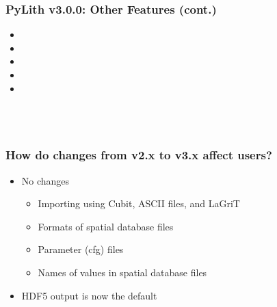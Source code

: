 \documentclass[aspectratio=169]{beamer}
\begin{document}
\begin{frame}
  \frametitle{PyLith v3.0.0: Other Features  (cont.)}
  \summary{}

  \begin{itemize}
  \item {}
  \item {}
  \item {}
  \item {}
  \item {}
 \end{itemize}
  \vfill\hfill%
  \begin{minipage}{0.25\textwidth}
    \\
    \\
  \end{minipage}  
  
\end{frame}


\begin{frame}
  \frametitle{How do changes from v2.x to v3.x affect users?}
  \summary{}

  \begin{itemize}
  \item No changes
    \begin{itemize}
    \item Importing using Cubit, ASCII files, and LaGriT
    \item Formats of spatial database files
    \end{itemize}
    \begin{itemize}
    \item Parameter (cfg) files
    \item Names of values in spatial database files
    \end{itemize}
  \item HDF5 output is now the default
  \end{itemize}
  
\end{frame}
\end{document}
